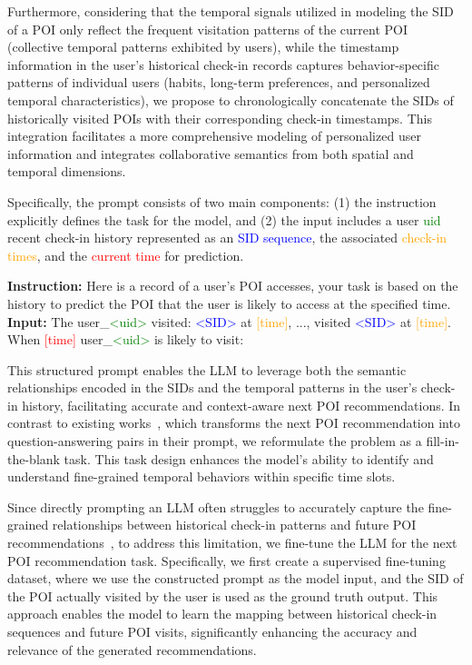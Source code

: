 Furthermore, considering that the temporal signals utilized in modeling the SID of a POI only reflect the frequent visitation patterns of the current POI (\ie collective temporal patterns exhibited by users), while the timestamp information in the user’s historical check-in records captures behavior-specific patterns of individual users (\eg habits, long-term preferences, and personalized temporal characteristics), we propose to chronologically concatenate the SIDs of historically visited POIs with their corresponding check-in timestamps. 
This integration facilitates a more comprehensive modeling of personalized user information and integrates collaborative semantics from both spatial and temporal dimensions.

Specifically, the prompt consists of two main components: (1) the instruction explicitly defines the task for the model, and (2) the input includes a user \textcolor{green}{uid} recent check-in history represented as an \textcolor{blue}{SID sequence}, the associated \textcolor{orange}{check-in times}, and the \textcolor{red}{current time} for prediction.
\begin{tcolorbox}[colback=yellow!20, colframe=white, coltitle=black, fonttitle=\bfseries, sharp corners]
 \textbf{Instruction:}  Here is a record of a user's POI accesses, your task is based on the history to predict the POI that the user is likely to access at the specified time.\\
 \textbf{Input:}  The user\_\textcolor{green}{<uid>} visited: \textcolor{blue}{<SID>} at \textcolor{orange}{[time]}, ..., visited \textcolor{blue}{<SID>} at \textcolor{orange}{[time]}. When \textcolor{red}{[time]} user\_\textcolor{green}{<uid>} is likely to visit:  
 \label{Prompt}
\end{tcolorbox}
This structured prompt enables the LLM to leverage both the semantic relationships encoded in the SIDs and the temporal patterns in the user's check-in history, facilitating accurate and context-aware next POI recommendations.
In contrast to existing works~\cite{li2024large}, which transforms the next POI recommendation into question-answering pairs in their prompt, we reformulate the problem as a fill-in-the-blank task. 
This task design enhances the model’s ability to identify and understand fine-grained temporal behaviors within specific time slots.

Since directly prompting an LLM often struggles to accurately capture the fine-grained relationships between historical check-in patterns and future POI recommendations~\cite{wang2023would}, to address this limitation, we fine-tune the LLM for the next POI recommendation task.
Specifically, we first create a supervised fine-tuning dataset, where we use the constructed prompt as the model input, and the SID of the POI actually visited by the user is used as the ground truth output. 
This approach enables the model to learn the mapping between historical check-in sequences and future POI visits, significantly enhancing the accuracy and relevance of the generated recommendations.






